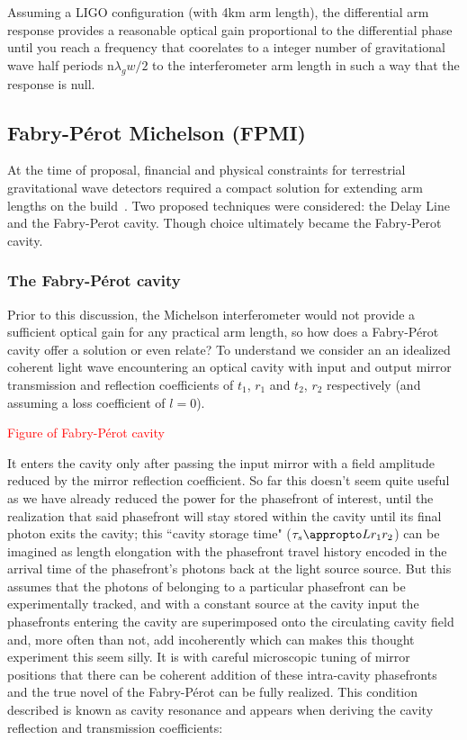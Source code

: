 Assuming a LIGO configuration (with 4km arm length), the differential arm response provides a reasonable optical gain proportional to the differential phase until you reach a frequency that coorelates to a integer number of gravitational wave half periods $\mathrm{n}\lambda_gw / 2$ to the interferometer arm length in such a way that the response is null.

\subsection{Fabry-P\'{e}rot Michelson (FPMI)}
At the time of proposal, financial and physical constraints for terrestrial gravitational wave detectors required a compact solution for extending arm lengths on the build~\cite{}. Two proposed techniques were considered: the Delay Line and the Fabry-Perot cavity. Though choice ultimately became the Fabry-Perot cavity.


\subsubsection{The Fabry-P\'{e}rot cavity}
Prior to this discussion, the Michelson interferometer would not provide a sufficient optical gain for any practical arm length, so how does a Fabry-P\'{e}rot cavity offer a solution or even relate?  To understand we consider an an idealized coherent light wave encountering an optical cavity with input and output mirror transmission and reflection coefficients of $t_1$, $r_1$ and $t_2$, $r_2$ respectively (and assuming a loss coefficient of $l=0$).

\textcolor{red}{Figure of Fabry-P\'{e}rot cavity}

It enters the cavity only after passing the input mirror with a field amplitude reduced by the mirror reflection coefficient. So far this doesn't seem quite useful as we have already reduced the power for the phasefront of interest, until the realization that said phasefront will stay stored within the cavity until its final photon exits the cavity; this ``cavity storage time" ($\tau_s \appropto L r_1r_2$) can be imagined as length elongation with the phasefront travel history encoded in the arrival time of the phasefront's photons back at the light source source. But this assumes that the photons of belonging to a particular phasefront can be experimentally tracked, and with a constant source at the cavity input the phasefronts entering the cavity are superimposed onto the circulating cavity field and, more often than not, add incoherently which can makes this thought experiment this seem silly. It is with careful microscopic tuning of mirror positions that there can be coherent addition of these intra-cavity phasefronts and the true novel of the Fabry-P\'{e}rot can be fully realized. This condition described is known as cavity resonance and appears when deriving the cavity reflection and transmission coefficients:

